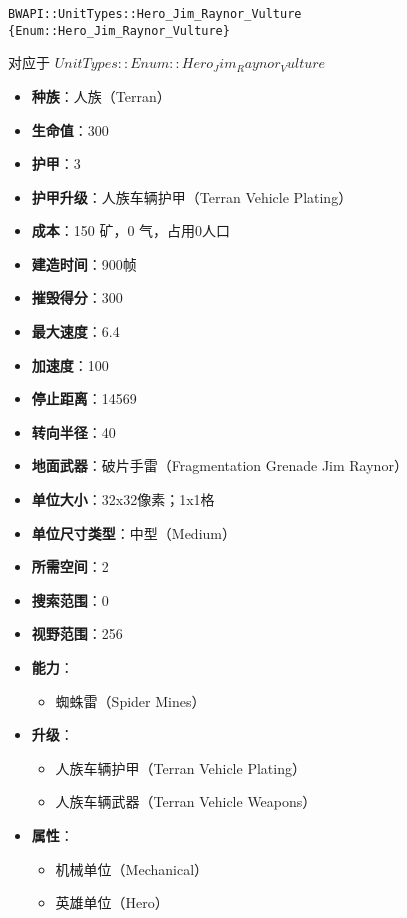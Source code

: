 \begin{tcolorbox}[colback=white, colframe=black!60!white, title=Hero\_Jim\_Raynor\_Vultur(), arc=0mm]
    \begin{verbatim}
BWAPI::UnitTypes::Hero_Jim_Raynor_Vulture {Enum::Hero_Jim_Raynor_Vulture}
    \end{verbatim}
    对应于  $ UnitTypes::Enum::Hero_Jim_Raynor_Vulture $ 
    \begin{itemize}
        \item \textbf{种族}：人族（Terran）
        \item \textbf{生命值}：300
        \item \textbf{护甲}：3
        \item \textbf{护甲升级}：人族车辆护甲（Terran Vehicle Plating）
        \item \textbf{成本}：150 矿，0 气，占用0人口
        \item \textbf{建造时间}：900帧
        \item \textbf{摧毁得分}：300
        \item \textbf{最大速度}：6.4
        \item \textbf{加速度}：100
        \item \textbf{停止距离}：14569
        \item \textbf{转向半径}：40
        \item \textbf{地面武器}：破片手雷（Fragmentation Grenade Jim Raynor）
        \item \textbf{单位大小}：32x32像素；1x1格
        \item \textbf{单位尺寸类型}：中型（Medium）
        \item \textbf{所需空间}：2
        \item \textbf{搜索范围}：0
        \item \textbf{视野范围}：256
        \item \textbf{能力}：
            \begin{itemize}
                \item 蜘蛛雷（Spider Mines）
            \end{itemize}
        \item \textbf{升级}：
            \begin{itemize}
                \item 人族车辆护甲（Terran Vehicle Plating）
                \item 人族车辆武器（Terran Vehicle Weapons）
            \end{itemize}
        \item \textbf{属性}：
            \begin{itemize}
                \item 机械单位（Mechanical）
                \item 英雄单位（Hero）
            \end{itemize}
    \end{itemize}
    
\end{tcolorbox}


